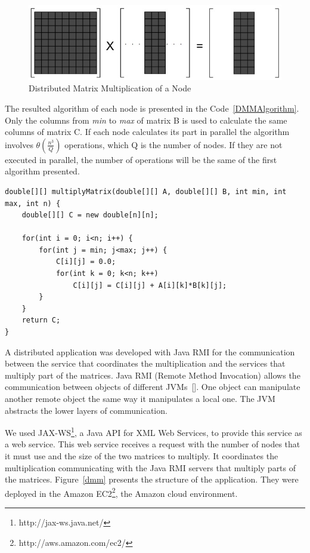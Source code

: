 \begin{figure}[htbp]
\begin{center}
	\includegraphics[scale=0.5]{images/matrices}
\caption{Distributed Matrix Multiplication of a Node}
\label{matrices}
\end{center}
\end{figure}

The resulted algorithm of each node is presented in the Code~\ref{DMMAlgorithm}. Only the columns from \emph{min} to \emph{max} of matrix B is used to calculate the same columns of matrix C. If each node calculates its part in parallel the algorithm involves $\theta(\frac{n^3}{Q})$ operations, which Q is the number of nodes. If they are not executed in parallel, the number of operations will be the same of the first algorithm presented.
\clearpage

\begin{lstlisting}
double[][] multiplyMatrix(double[][] A, double[][] B, int min, int max, int n) {
	double[][] C = new double[n][n];
	
	for(int i = 0; i<n; i++) {
		for(int j = min; j<max; j++) {
			C[i][j] = 0.0;
			for(int k = 0; k<n; k++)
				C[i][j] = C[i][j] + A[i][k]*B[k][j];
		}
	}
	return C;
}
\end{lstlisting}

A distributed application was developed with Java RMI for the communication between the service that coordinates the multiplication and the services that multiply part of the matrices. Java RMI (Remote Method Invocation) allows the communication between objects of different JVMs~[\citet{JavaRMI}]. One object can manipulate another remote object the same way it manipulates a local one. The JVM abstracts the lower layers of communication.

We used JAX-WS\footnote{http://jax-ws.java.net/}, a Java API for XML Web Services, to provide this service as a web service.  This web service receives a request with the number of nodes that it must use and the size of the two matrices to multiply. It coordinates the multiplication communicating with the Java RMI servers that multiply parts of the matrices. Figure~\ref{dmm} presents the structure of the application. They were deployed in the Amazon EC2\footnote{http://aws.amazon.com/ec2/}, the Amazon cloud environment.

